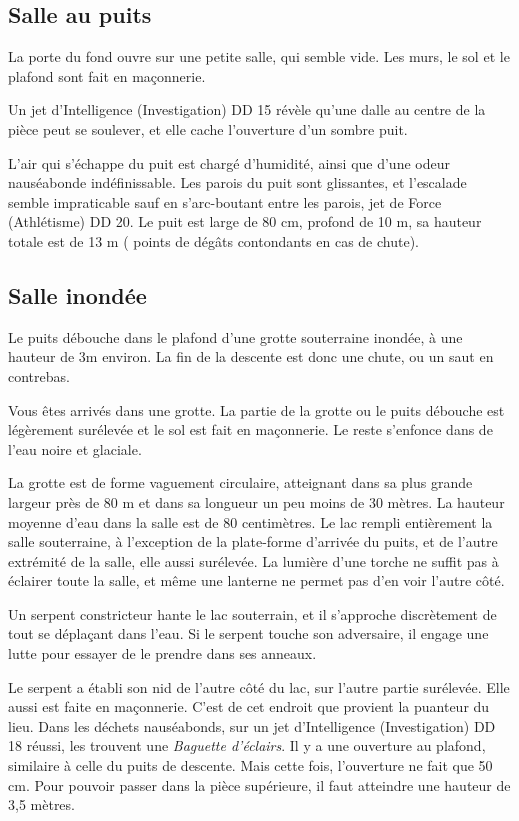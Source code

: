 \documentclass[a4paper,10pt,openany]{book}
\begin{document}
\begin{multicols}{2}
\subsection{Salle au puits}
\begin{paperbox}{ }
	La porte du fond ouvre sur une petite salle, qui semble vide. Les murs, le sol et le plafond sont fait en maçonnerie.
\end{paperbox}
Un jet d’Intelligence (Investigation) DD 15 révèle qu’une dalle au centre de la pièce peut se soulever, et elle cache l’ouverture d’un sombre
puit.\par L’air qui s’échappe du puit est chargé d’humidité, ainsi que d’une odeur nauséabonde indéfinissable. Les parois du puit sont glissantes, et
l’escalade semble impraticable sauf en s’arc-boutant entre les parois, jet de Force (Athlétisme) DD 20. Le puit est large de 80 cm, profond de 10 m,
sa hauteur totale est de 13 m ( points de dégâts contondants en cas de chute).

\subsection{Salle inondée}
Le puits débouche dans le plafond d’une grotte souterraine inondée, à une hauteur de 3m environ. La fin de la descente est donc une chute, ou un saut
en contrebas.
\begin{paperbox}{ }
	Vous êtes arrivés dans une grotte. La partie de la grotte ou le puits débouche est légèrement surélevée et le sol est fait en maçonnerie. Le reste
	s’enfonce dans de l’eau noire et glaciale.
\end{paperbox}
La grotte est de forme vaguement circulaire, atteignant dans sa plus grande largeur près de 80 m et dans sa longueur un peu moins de 30 mètres. La
hauteur moyenne d’eau dans la salle est de 80 centimètres. Le lac rempli entièrement la salle souterraine, à l’exception de la plate-forme d’arrivée
du puits, et de l’autre extrémité de la salle, elle aussi surélevée. La lumière d’une torche ne suffit pas à éclairer toute la salle, et même une
lanterne ne permet pas d’en voir l’autre côté.\par Un serpent constricteur hante le lac souterrain, et il s’approche discrètement de tout \PJ se
déplaçant dans l’eau. Si le serpent touche son adversaire, il engage une lutte pour essayer de le prendre dans ses anneaux.\par Le serpent a établi
son nid de l’autre côté du lac, sur l’autre partie surélevée. Elle aussi est faite en maçonnerie. C’est de cet endroit que provient la puanteur du
lieu. Dans les déchets nauséabonds, sur un jet d’Intelligence (Investigation) DD 18 réussi, les \PJs trouvent une \emph{Baguette d’éclairs}. Il y a
une ouverture au plafond, similaire à celle du puits de descente. Mais cette fois, l’ouverture ne fait que 50 cm. Pour pouvoir passer dans la pièce
supérieure, il faut atteindre une hauteur de 3,5 mètres.


\end{multicols}
\end{document}
